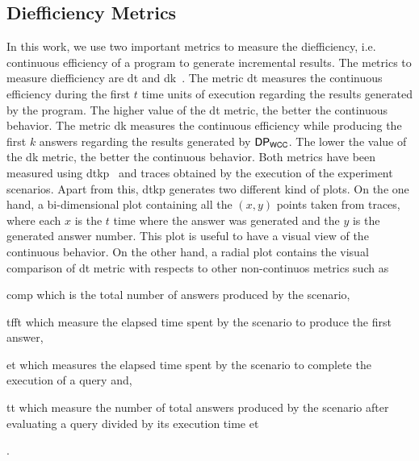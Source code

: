 \subsection{Diefficiency Metrics}\label{prem:dief}
In this work, we use two important metrics to measure the diefficiency, i.e. continuous efficiency of a program to generate incremental results.
The metrics to measure diefficiency are \acrfull{dt} and \acrfull{dk}~\cite{diefpaper}.
The metric \acrshort{dt} measures the continuous efficiency during the first $t$ time units of execution regarding the results generated by the program. 
The higher value of the \acrshort{dt} metric, the better the continuous behavior.
The metric \acrshort{dk} measures the continuous efficiency while producing the first $k$ answers regarding the results generated by $\mathsf{DP_{WCC}}$. The lower the value of the \acrshort{dk} metric, the better the continuous behavior.
Both metrics have been measured using \acrfull{dtkp}~\cite{diefpy} and traces obtained by the execution of the experiment scenarios.
Apart from this, \acrshort{dtkp} generates two different kind of plots. On the one hand, a bi-dimensional plot containing all the $(x,y)$ points taken from traces, where each $x$ is the $t$ time where the answer was generated and the $y$ is the generated answer number.
This plot is useful to have a visual view of the continuous behavior. On the other hand, a radial plot contains the visual comparison of \acrshort{dt} metric with respects to other non-continuos metrics such as 
\begin{inparaenum}[\bf i\upshape)]
  \item \acrfull{comp} which is the total number of answers produced by the scenario, 
  \item \acrfull{tfft} which measure the elapsed time spent by the scenario to produce the first answer, 
  \item \acrfull{et} which measures the elapsed time spent by the scenario to complete the execution of a query and, 
  \item \acrfull{tt} which measure the number of total answers produced by the scenario after evaluating a query divided by its execution time \acrshort{et}
\end{inparaenum}.

